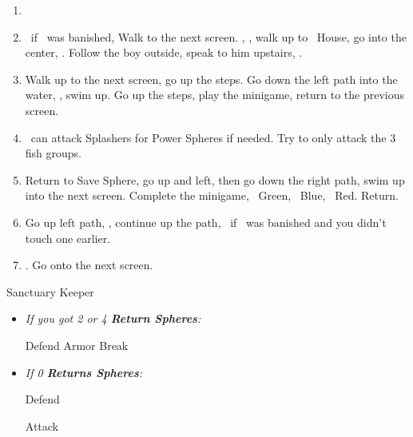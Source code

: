 \begin{enumerate}[resume]
	\item \formation{\tidus}{\kimahri}{\auron}
	\item \save\ if \bahamut\ was banished, Walk to the next screen. \skippablefmv[0:20], \sd, walk up to \tidus\ House, go into the center, \sd. Follow the boy outside, speak to him upstairs, \sd.
	\item Walk up to the next screen, go up the steps. Go down the left path into the water, \sd, swim up. Go up the steps, play the minigame, return to the previous screen.
	\item \tidus\ can attack Splashers for Power Spheres if needed. Try to only attack the 3 fish groups.
	\item Return to Save Sphere, go up and left, then go down the right path, swim up into the next screen. Complete the minigame, \rikku\ Green, \tidus\ Blue, \wakka\ Red. Return.
	\item Go up left path, \sd, continue up the path, \save\ if \bahamut\ was banished and you didn't touch one earlier.
	\item \formation{\tidus}{\yuna}{\wakka}. Go onto the next screen.
\end{enumerate}
\bothvfill
\winvfill
\lossvfill
\begin{battle}[40000]{Sanctuary Keeper}
	\begin{itemize}
		\item \textit{If you got 2 or 4 \textbf{Return Spheres}:}
			\begin{itemize}
				\yunaf Defend
				\tidusf Armor Break
			\end{itemize}
		\item \textit{If 0 \textbf{Returns Spheres}:}
			\begin{itemize}
				\tidusf Defend
			\end{itemize}
		\summon{\bahamut}
		\bahamutf Attack
	\end{itemize}
\end{battle}
